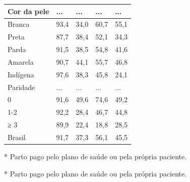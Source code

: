 \documentclass{article}
\begin{document}
\begin{table}
\begin{xtabular}{ l | l | l | l | l }
Cor da pele
& ...
& ...
& ...
& ...
\\ \hline

Branca
& 93,4
& 34,0
& 60,7
& 55,1
\\ \hline

Preta
& 87,7
& 38,4
& 52,1
& 34,3
\\ \hline

Parda
& 91,5
& 38,5
& 54,8
& 41,6
\\ \hline

Amarela
& 90,7
& 44,1
& 55,7
& 46,8
\\ \hline

Indígena
& 97,6
& 38,3
& 45,8
& 24,1
\\ \hline

Paridade
& ...
& ...
& ...
& ...
\\ \hline

0
& 91,6
& 49,6
& 74,6
& 49,2
\\ \hline

1-2
& 92,2
& 28,4
& 46,7
& 44,8
\\ \hline

≥ 3
& 89,9
& 22,4
& 18,8
& 28,5
\\ \hline

Brasil
& 91,7
& 37,3
& 56,1
& 45,5
\\ \hline

\end{xtabular}
\end{table}

* Parto pago pelo plano de saúde ou pela própria paciente.

* Parto pago pelo plano de saúde ou pela própria paciente.
\end{document}
